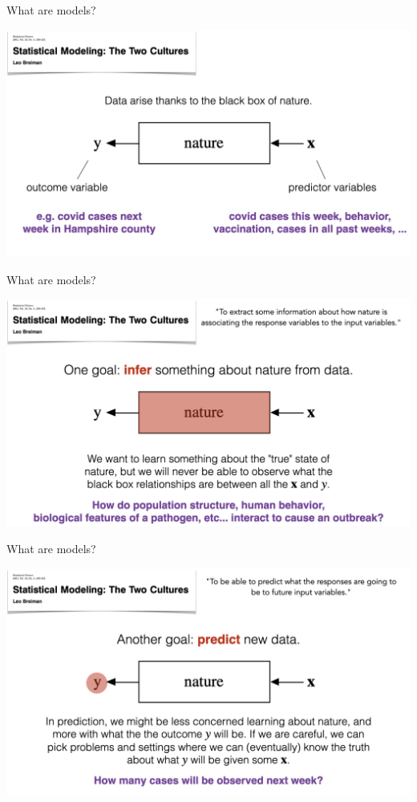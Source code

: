 \documentclass[table]{beamer}\usepackage[]{graphicx}\usepackage[]{color}
\begin{document}

\begin{frame}{What are models?}

\includegraphics[width=\textwidth]{figure-static/models1.jpeg}

\end{frame}

\begin{frame}{What are models?}

\includegraphics[width=\textwidth]{figure-static/models2.jpeg}

\end{frame}

\begin{frame}{What are models?}

\includegraphics[width=\textwidth]{figure-static/models3.jpeg}

\end{frame}
\end{document}
